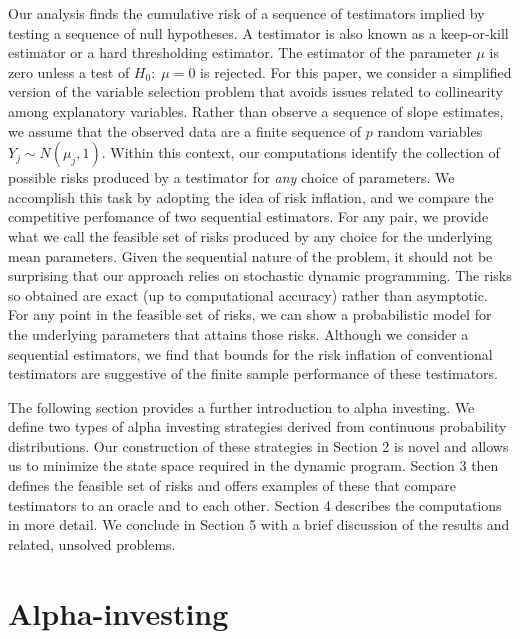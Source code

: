 \documentclass[12pt]{article}
\begin{document}
 Our analysis finds the cumulative risk of a sequence of testimators implied by
 testing a sequence of null hypotheses.  A testimator is also known as a
 keep-or-kill estimator or a hard thresholding estimator.  The estimator of the
 parameter $\mu$ is zero unless a test of $H_0: \; \mu = 0$ is rejected.  For
 this paper, we consider a simplified version of the variable selection problem
 that avoids issues related to collinearity among explanatory variables.  Rather
 than observe a sequence of slope estimates, we assume that the observed data
 are a finite sequence of $p$ random variables $Y_j \sim N(\mu_j,1)$.  Within
 this context, our computations identify the collection of possible risks
 produced by a testimator for {\em any} choice of parameters.  We accomplish
 this task by adopting the idea of risk inflation, and we compare the
 competitive perfomance of two sequential estimators.  For any pair, we provide
 what we call the feasible set of risks produced by any choice for the
 underlying mean parameters.  Given the sequential nature of the problem, it
 should not be surprising that our approach relies on stochastic dynamic
 programming.  The risks so obtained are exact (up to computational accuracy)
 rather than asymptotic.  For any point in the feasible set of risks, we can
 show a probabilistic model for the underlying parameters that attains those
 risks.  Although we consider a sequential estimators, we find that bounds for
 the risk inflation of conventional testimators are suggestive of the finite
 sample performance of these testimators.


 The following section provides a further introduction to alpha investing.  We
 define two types of alpha investing strategies derived from continuous
 probability distributions.  Our construction of these strategies in Section 2
 is novel and allows us to minimize the state space required in the dynamic
 program.  Section 3 then defines the feasible set of risks and offers examples
 of these that compare testimators to an oracle and to each other.  Section 4
 describes the computations in more detail.  We conclude in Section 5 with a
 brief discussion of the results and related, unsolved problems.



\section{ Alpha-investing }
\end{document}

